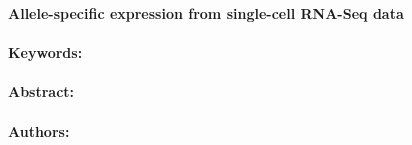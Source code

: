 \noindent
\large {\bf Allele-specific expression from single-cell RNA-Seq data} 


\normalsize 


\noindent \paragraph{Keywords:} 

\noindent \paragraph{Abstract:} 



\noindent \paragraph{Authors:} 

